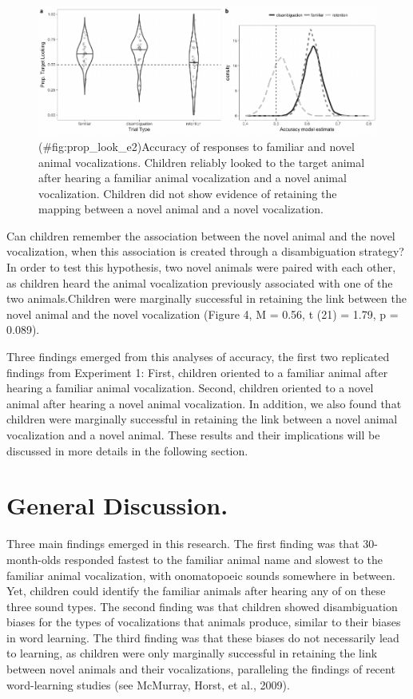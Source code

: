 \documentclass[english,floatsintext,man]{apa6}
\theoremstyle{definition}
\theoremstyle{definition}
\theoremstyle{definition}
\theoremstyle{remark}
\begin{document}
\begin{figure}
\centering
\includegraphics{anime_manuscript_files/figure-latex/prop_look_e2-1.pdf}
\caption{(\#fig:prop\_look\_e2)Accuracy of responses to familiar and
novel animal vocalizations. Children reliably looked to the target
animal after hearing a familiar animal vocalization and a novel animal
vocalization. Children did not show evidence of retaining the mapping
between a novel animal and a novel vocalization.}
\end{figure}

Can children remember the association between the novel animal and the
novel vocalization, when this association is created through a
disambiguation strategy? In order to test this hypothesis, two novel
animals were paired with each other, as children heard the animal
vocalization previously associated with one of the two animals.Children
were marginally successful in retaining the link between the novel
animal and the novel vocalization (Figure 4, M = 0.56, t (21) = 1.79, p
= 0.089).

Three findings emerged from this analyses of accuracy, the first two
replicated findings from Experiment 1: First, children oriented to a
familiar animal after hearing a familiar animal vocalization. Second,
children oriented to a novel animal after hearing a novel animal
vocalization. In addition, we also found that children were marginally
successful in retaining the link between a novel animal vocalization and
a novel animal. These results and their implications will be discussed
in more details in the following section.

\section{General Discussion.}\label{general-discussion.}

Three main findings emerged in this research. The first finding was that
30-month-olds responded fastest to the familiar animal name and slowest
to the familiar animal vocalization, with onomatopoeic sounds somewhere
in between. Yet, children could identify the familiar animals after
hearing any of on these three sound types. The second finding was that
children showed disambiguation biases for the types of vocalizations
that animals produce, similar to their biases in word learning. The
third finding was that these biases do not necessarily lead to learning,
as children were only marginally successful in retaining the link
between novel animals and their vocalizations, paralleling the findings
of recent word-learning studies (see McMurray, Horst, et al., 2009).
\end{document}
